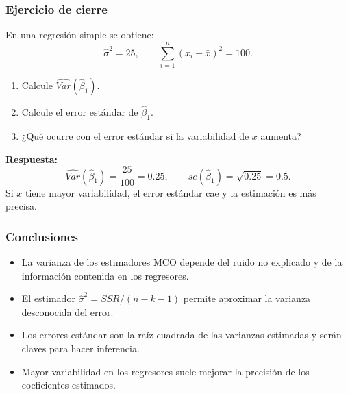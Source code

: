 \documentclass{beamer}
\begin{document}
\begin{frame}
\frametitle{Ejercicio de cierre}

En una regresión simple se obtiene:
\[
\hat{\sigma}^2=25, \qquad \sum_{i=1}^{n}(x_i-\bar{x})^2=100.
\]

\begin{enumerate}
    \item Calcule \(\widehat{Var}(\hat{\beta}_1)\).
    \item Calcule el error estándar de \(\hat{\beta}_1\).
    \item ¿Qué ocurre con el error estándar si la variabilidad de \(x\) aumenta?
\end{enumerate}

\vspace{0.2cm}
\textbf{Respuesta:}
\[
\widehat{Var}(\hat{\beta}_1)=\frac{25}{100}=0.25,
\qquad se(\hat{\beta}_1)=\sqrt{0.25}=0.5.
\]
Si \(x\) tiene mayor variabilidad, el error estándar cae y la estimación es más precisa.

\end{frame}

\begin{frame}
\frametitle{Conclusiones}
\begin{itemize}
    \item La varianza de los estimadores MCO depende del ruido no explicado y de la información contenida en los regresores.
    \item El estimador \(\hat{\sigma}^2=SSR/(n-k-1)\) permite aproximar la varianza desconocida del error.
    \item Los errores estándar son la raíz cuadrada de las varianzas estimadas y serán claves para hacer inferencia.
    \item Mayor variabilidad en los regresores suele mejorar la precisión de los coeficientes estimados.
\end{itemize}
\end{frame}
\end{document}
